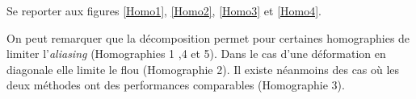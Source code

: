 

Se reporter aux figures \ref{Homo1}, \ref{Homo2}, \ref{Homo3} et \ref{Homo4}.

On peut remarquer que la décomposition permet pour certaines homographies de limiter l'\emph{aliasing} (Homographies 1 ,4 et 5). Dans le cas d'une déformation en diagonale elle limite le flou (Homographie 2). Il existe néanmoins des cas où les deux méthodes ont des performances comparables (Homographie 3).

\begin{figure}

\end{figure}
